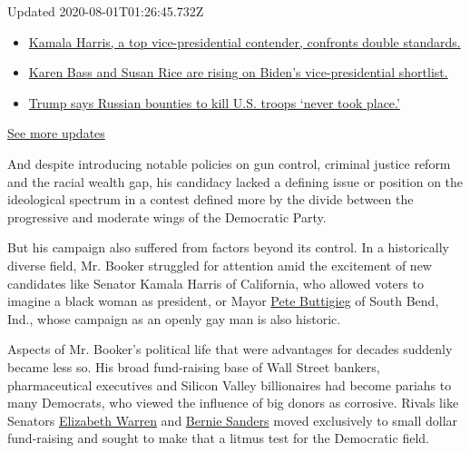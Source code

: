 Updated 2020-08-01T01:26:45.732Z

\begin{itemize}
\tightlist
\item
  \href{https://www.nytimes.com/2020/07/31/us/elections/biden-vs-trump.html?action=click\&pgtype=Article\&state=default\&region=MAIN_CONTENT_1\&context=storylines_live_updates\#link-29fdff45}{Kamala
  Harris, a top vice-presidential contender, confronts double
  standards.}
\item
  \href{https://www.nytimes.com/2020/07/31/us/elections/biden-vs-trump.html?action=click\&pgtype=Article\&state=default\&region=MAIN_CONTENT_1\&context=storylines_live_updates\#link-13ec3d9c}{Karen
  Bass and Susan Rice are rising on Biden's vice-presidential
  shortlist.}
\item
  \href{https://www.nytimes.com/2020/07/31/us/elections/biden-vs-trump.html?action=click\&pgtype=Article\&state=default\&region=MAIN_CONTENT_1\&context=storylines_live_updates\#link-49e9a016}{Trump
  says Russian bounties to kill U.S. troops `never took place.'}
\end{itemize}

\href{https://www.nytimes.com/2020/07/31/us/elections/biden-vs-trump.html?action=click\&pgtype=Article\&state=default\&region=MAIN_CONTENT_1\&context=storylines_live_updates}{See
more updates}

And despite introducing notable policies on gun control, criminal
justice reform and the racial wealth gap, his candidacy lacked a
defining issue or position on the ideological spectrum in a contest
defined more by the divide between the progressive and moderate wings of
the Democratic Party.

But his campaign also suffered from factors beyond its control. In a
historically diverse field, Mr. Booker struggled for attention amid the
excitement of new candidates like Senator Kamala Harris of California,
who allowed voters to imagine a black woman as president, or Mayor
\href{https://www.nytimes.com/interactive/2020/us/elections/pete-buttigieg.html}{Pete
Buttigieg} of South Bend, Ind., whose campaign as an openly gay man is
also historic.

Aspects of Mr. Booker's political life that were advantages for decades
suddenly became less so. His broad fund-raising base of Wall Street
bankers, pharmaceutical executives and Silicon Valley billionaires had
become pariahs to many Democrats, who viewed the influence of big donors
as corrosive. Rivals like Senators
\href{https://www.nytimes.com/interactive/2020/us/elections/elizabeth-warren.html}{Elizabeth
Warren} and
\href{https://www.nytimes.com/interactive/2020/us/elections/bernie-sanders.html}{Bernie
Sanders} moved exclusively to small dollar fund-raising and sought to
make that a litmus test for the Democratic field.

